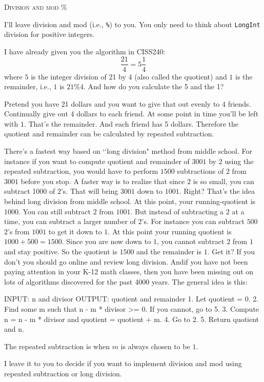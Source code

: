 \newpage 
\textsc{Division and mod \%}

I'll leave division and mod (i.e., \texttt{\%}) to you. You only need to think 
about \verb!LongInt! division for positive integers.

I have already given you the algorithm in CISS240:
\[
\frac{21}{4} = 5 \frac{1}{4}
\]
where $5$ is the integer division of 21 by 4 (also called the quotient)
and $1$ is the remainder, i.e., $1$ is $21 \% 4$.
And how do you calculate the 5 and the 1?

Pretend you have 21 dollars and you want to give that out evenly to 4 friends.
Continually give out 4 dollars to each friend.
At some point in time you'll be left with $1$. That's the remainder.
And each friend has 5 dollars.
Therefore the quotient and remainder can be calculated
by repeated subtraction.

There's a fastest way based on \lq\lq long division" method from middle
school.
For instance if you want to compute quotient and remainder of
$3001$ by $2$ using the repeated subtraction, you would have to perform
$1500$ subtractions of $2$ from $3001$ before you stop.
A faster way is to realize that since $2$ is so small, you can
subtract 1000 of $2$'s.
That will bring $3001$ down to $1001$. Right?
That's the idea behind long division from middle school.
At this point, your running-quotient is $1000$.
You can still subtract $2$ from $1001$.
But instead of subtracting a $2$ at a time, you can subtract a larger
number of $2$'s.
For instance you can subtract $500$ $2$'s from $1001$
to get it down to $1$.
At this point your running quotient is $1000 + 500 = 1500$.
Since you are now down to $1$, you cannot subtract $2$ from $1$ and stay
positive.
So the quotient is $1500$ and the remainder is $1$.
Get it?
If you don't you should go online and review long division.
Andif you have not been paying attention in your K-12 math classes, then you
have been missing out on lots of algorithms discovered for the past 4000 years.
The general idea is this:
\begin{console}[fontsize=\footnotesize]
INPUT: n and divisor
OUTPUT: quotient and remainder
1. Let quotient = 0.
2. Find some m such that n - m * divisor >= 0. If you cannot, go to 5.
3. Compute n = n - m * divisor and quotient = quotient + m.
4. Go to 2.
5. Return quotient and n.
\end{console}
The repeated subtraction is when $m$ is always chosen to be $1$.

I leave it to you to decide if you want to implement division and mod using
repeated subtraction or long division.



